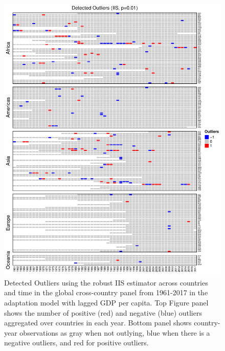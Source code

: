 \documentclass[11pt, letterpaper]{article}
\numberwithin{algorithm}{section}
\numberwithin{assumption}{section}
\numberwithin{lemma}{section}
\numberwithin{theorem}{section}
\numberwithin{corollary}{section}
\numberwithin{remark}{section}
\numberwithin{equation}{section}
\numberwithin{figure}{section}
\numberwithin{table}{section}
\begin{document}
\begin{figure}[!htbp]  \vspace{-.35in}
\centering
\includegraphics[width = \textwidth]{heat1_adapt.L1.pdf}
\caption{Detected Outliers using the robust IIS estimator across countries and time in the global cross-country panel from 1961-2017 in the adaptation model with lagged GDP per capita. Top Figure panel shows the number of positive (red) and negative (blue) outliers aggregated over countries in each year. Bottom panel shows country-year observations as gray when not outlying, blue when there is a negative outliers, and red for positive outliers.}
\label{fig_out_app2_appendix}
\end{figure}
\end{document}
